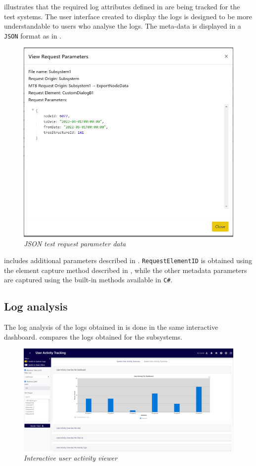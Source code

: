  illustrates that the required log attributes defined in  are being tracked for the test systems. The user interface created to display the logs is designed to be more understandable to users who analyse the logs. The meta-data is displayed in a \texttt{JSON} format as in .

\clearpage

\begin{figure}[!htb]
	\centering %
	\includegraphics[width=0.6\linewidth]{img/ch3/analysis/UAT_request_params.png}
	\caption[JSON test request parameter data]
	{\textit{JSON test request parameter data}}\label{fig:ch3_JSON_Test_Result}
\end{figure}

 includes additional parameters described in . \texttt{RequestElementID} is obtained using the element capture method described in , while the other metadata parameters are captured using the built-in methods available in \texttt{C\#}.

\subsection{Log analysis}
The log analysis of the logs obtained in  is done in the same interactive dashboard.  compares the logs obtained for the subsystems.

\begin{figure}[!htb]
	\centering %
	\includegraphics[width=0.99\linewidth]{img/ch3/analysis/UAT_menu_analysis.png}
	\caption[Interactive user activity viewer]
	{\textit{Interactive user activity viewer}}\label{fig:ch3_UAT_menuAnalysis}
\end{figure}

